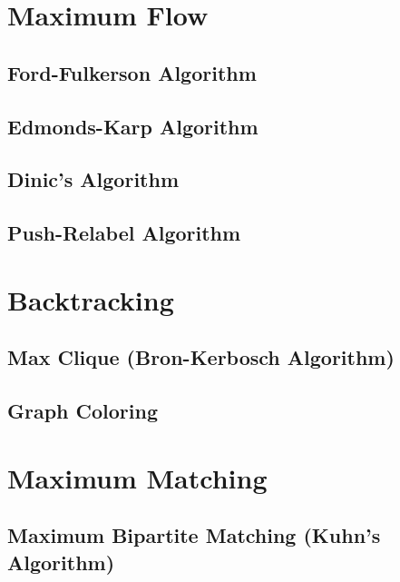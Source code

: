\section{Maximum Flow}
\setcounter{section}{5}
\setcounter{subsection}{0}
\subsection{Ford-Fulkerson Algorithm}

\subsection{Edmonds-Karp Algorithm}

\subsection{Dinic's Algorithm}

\subsection{Push-Relabel Algorithm}


\section{Backtracking}
\setcounter{section}{6}
\setcounter{subsection}{0}
\subsection{Max Clique (Bron-Kerbosch Algorithm)}

\subsection{Graph Coloring}


\section{Maximum Matching}
\setcounter{section}{7}
\setcounter{subsection}{0}
\subsection{Maximum Bipartite Matching (Kuhn's Algorithm)}


